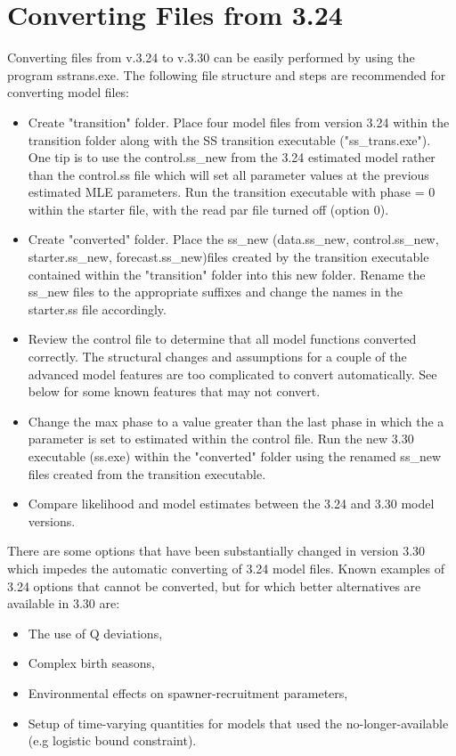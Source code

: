 \hypertarget{ConvIssues}{}
\section{Converting Files from 3.24}
Converting files from v.3.24 to v.3.30 can be easily performed by using the program sstrans.exe. The following file structure and steps are recommended for converting model files:
\begin{itemize}
	\item Create "transition" folder.  Place four model files from version 3.24 within the transition folder along with the SS transition executable ("ss\_trans.exe").  One tip is to use the control.ss\_new from the 3.24 estimated model rather than the control.ss file which will set all parameter values at the previous estimated MLE parameters.  Run the transition executable with phase = 0 within the starter file, with the read par file turned off (option 0).
	\item Create "converted" folder.  Place the ss\_new (data.ss\_new, control.ss\_new, starter.ss\_new, forecast.ss\_new)files created by the transition executable contained within the "transition" folder into this new folder.  Rename the ss\_new files to the appropriate suffixes and change the names in the starter.ss file accordingly.
	\item Review the control file to determine that all model functions converted correctly.  The structural changes and assumptions for a couple of the advanced model features are too complicated to convert automatically.  See below for some known features that may not convert.
	\item Change the max phase to a value greater than the last phase in which the a parameter is set to estimated within the control file.  Run the new 3.30 executable (ss.exe) within the "converted" folder using the renamed ss\_new files created from the transition executable.
	\item Compare likelihood and model estimates between the 3.24 and 3.30 model versions.
\end{itemize}

\noindent There are some options that have been substantially changed in version 3.30 which impedes the automatic converting of 3.24 model files. Known examples of 3.24 options that cannot be converted, but for which better alternatives are available in 3.30 are:
\begin{itemize}
	\item The use of Q deviations,
	\item Complex birth seasons,
	\item Environmental effects on spawner-recruitment parameters,
	\item Setup of time-varying quantities for models that used the no-longer-available (e.g logistic bound constraint).
\end{itemize}
